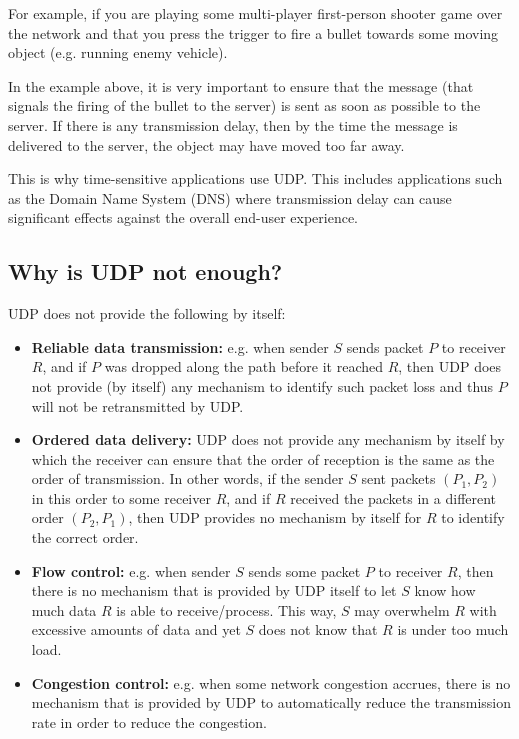 \documentclass[pdftex,12pt,a4paper]{article}
\begin{document}
            For example, if you are playing some multi-player first-person
            shooter game over the network and that you press the trigger to
            fire a bullet towards some moving object (e.g. running enemy
            vehicle).
            
            In the example above, it is very important to ensure that the
            message (that signals the firing of the bullet to the server) is
            sent as soon as possible to the server. If there is any
            transmission delay, then by the time the message is delivered to
            the server, the object may have moved too far away.

            This is why time-sensitive applications use UDP. This includes
            applications such as the Domain Name System (DNS) where
            transmission delay can cause significant effects against the
            overall end-user experience.

        \subsection{Why is UDP not enough?}
            UDP does not provide the following by itself:
            \begin{itemize}
                \item \textbf{Reliable data transmission:} e.g. when sender $S$ sends
                    packet $P$ to receiver $R$, and if $P$ was dropped along
                    the path before it reached $R$, then UDP does not provide
                    (by itself) any mechanism to identify such packet loss and
                    thus $P$ will not be retransmitted by UDP.
                \item \textbf{Ordered data delivery:} UDP does not provide
                    any mechanism by itself by which the receiver can ensure
                    that the order of reception is the same as the order of
                    transmission. In other words, if the sender $S$ sent packets
                    $(P_1, P_2)$ in this order to some receiver $R$, and if
                    $R$ received the packets in a different order $(P_2, P_1)$,
                    then UDP provides no mechanism by itself for $R$ to
                    identify the correct order.
                    
                \item \textbf{Flow control:} e.g. when sender $S$ sends some packet $P$
                    to receiver $R$, then there is no mechanism that is
                    provided by UDP itself to let $S$ know how much data $R$ is
                    able to receive/process. This way, $S$ may overwhelm $R$
                    with excessive amounts of data and yet $S$ does not know
                    that $R$ is under too much load.
                \item \textbf{Congestion control:} e.g. when some network congestion
                    accrues, there is no mechanism that is provided by UDP to
                    automatically reduce the transmission rate in order to
                    reduce the congestion.
            \end{itemize}
\end{document}
